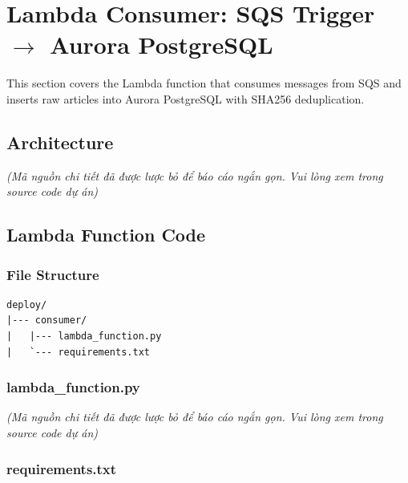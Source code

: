 \hypertarget{lambda-consumer-sqs-trigger-rightarrow-aurora-postgresql}{%
\section{\texorpdfstring{Lambda Consumer: SQS Trigger \(\rightarrow\)
Aurora
PostgreSQL}{Lambda Consumer: SQS Trigger \textbackslash rightarrow Aurora PostgreSQL}}}

This section covers the Lambda function that consumes messages from SQS
and inserts raw articles into Aurora PostgreSQL with SHA256
deduplication.

\hypertarget{architecture}{%
\subsection{Architecture}}

\emph{(Mã nguồn chi tiết đã được lược bỏ để báo cáo ngắn gọn. Vui lòng
xem trong source code dự án)}

\hypertarget{lambda-function-code}{%
\subsection{Lambda Function Code}}

\hypertarget{file-structure}{%
\subsubsection{File Structure}}

\begin{verbatim}
deploy/
|--- consumer/
|   |--- lambda_function.py
|   `--- requirements.txt
\end{verbatim}

\hypertarget{lambda_function.py}{%
\subsubsection{lambda\_function.py}}

\emph{(Mã nguồn chi tiết đã được lược bỏ để báo cáo ngắn gọn. Vui lòng
xem trong source code dự án)}

\hypertarget{requirements.txt}{%
\subsubsection{requirements.txt}}

\begin{Shaded}
\begin{Highlighting}[]
\end{Highlighting}
\end{Shaded}

